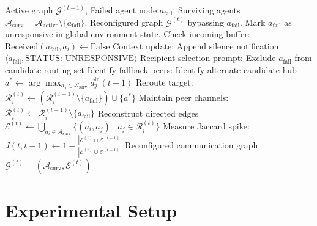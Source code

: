 \documentclass{ieeeaccess}
\begin{document}
\begin{algorithm}[t]
\caption{Dynamic Edge Reconfiguration and Failure Bypass}
\label{alg:dynamic_reconfiguration}
\begin{algorithmic}[1]
\REQUIRE Active graph $\mathcal{G}^{(t-1)}$, Failed agent node $a_{\text{fail}}$, Surviving agents $\mathcal{A}_{\text{surv}} = \mathcal{A}_{\text{active}} \setminus \{a_{\text{fail}}\}$.
\ENSURE Reconfigured graph $\mathcal{G}^{(t)}$ bypassing $a_{\text{fail}}$.
\STATE Mark $a_{\text{fail}}$ as unresponsive in global environment state.
    \STATE Check incoming buffer: $\text{Received}(a_{\text{fail}}, a_i) \leftarrow \text{False}$
    \STATE Context update: Append silence notification $\langle a_{\text{fail}}, \text{STATUS: UNRESPONSIVE} \rangle$
    \STATE Recipient selection prompt: Exclude $a_{\text{fail}}$ from candidate routing set
    \STATE Identify fallback peers:
        \STATE Identify alternate candidate hub $a^* \leftarrow \arg\max_{a_j \in \mathcal{A}_{\text{surv}}} d_j^{\text{in}}(t-1)$
        \STATE Reroute target: $\mathcal{R}_i^{(t)} \leftarrow (\mathcal{R}_i^{(t-1)} \setminus \{a_{\text{fail}}\}) \cup \{a^*\}$
    \ELSE
        \STATE Maintain peer channels: $\mathcal{R}_i^{(t)} \leftarrow \mathcal{R}_i^{(t-1)} \setminus \{a_{\text{fail}}\}$
    \ENDIF
\ENDFOR
\STATE Reconstruct directed edges $\mathcal{E}^{(t)} \leftarrow \bigcup_{a_i \in \mathcal{A}_{\text{surv}}} \{ (a_i, a_j) \mid a_j \in \mathcal{R}_i^{(t)} \}$
\STATE Measure Jaccard spike: $J(t, t-1) \leftarrow 1 - \frac{|\mathcal{E}^{(t)} \cap \mathcal{E}^{(t-1)}|}{|\mathcal{E}^{(t)} \cup \mathcal{E}^{(t-1)}|}$
\RETURN Reconfigured communication graph $\mathcal{G}^{(t)} = (\mathcal{A}_{\text{surv}}, \mathcal{E}^{(t)})$
\end{algorithmic}
\end{algorithm}


\section{Experimental Setup}
\label{sec:experimental}
\end{document}
